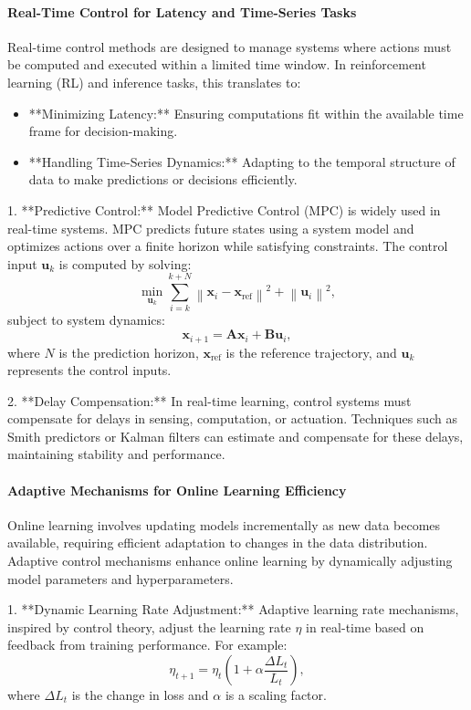 \documentclass{IEEEojcsys}
\begin{document}
\paragraph{Real-Time Control for Latency and Time-Series Tasks}
Real-time control methods are designed to manage systems where actions must be computed and executed within a limited time window. In reinforcement learning (RL) and inference tasks, this translates to:
\begin{itemize}
    \item **Minimizing Latency:** Ensuring computations fit within the available time frame for decision-making.
    \item **Handling Time-Series Dynamics:** Adapting to the temporal structure of data to make predictions or decisions efficiently.
\end{itemize}

1. **Predictive Control:**
   Model Predictive Control (MPC) is widely used in real-time systems. MPC predicts future states using a system model and optimizes actions over a finite horizon while satisfying constraints. The control input $\mathbf{u}_k$ is computed by solving:
   \[
   \min_{\mathbf{u}_k} \sum_{i=k}^{k+N} \left\| \mathbf{x}_i - \mathbf{x}_{\text{ref}} \right\|^2 + \left\| \mathbf{u}_i \right\|^2,
   \]
   subject to system dynamics:
   \[
   \mathbf{x}_{i+1} = \mathbf{A} \mathbf{x}_i + \mathbf{B} \mathbf{u}_i,
   \]
   where $N$ is the prediction horizon, $\mathbf{x}_{\text{ref}}$ is the reference trajectory, and $\mathbf{u}_k$ represents the control inputs.

2. **Delay Compensation:**
   In real-time learning, control systems must compensate for delays in sensing, computation, or actuation. Techniques such as Smith predictors or Kalman filters can estimate and compensate for these delays, maintaining stability and performance.

\paragraph{Adaptive Mechanisms for Online Learning Efficiency}
Online learning involves updating models incrementally as new data becomes available, requiring efficient adaptation to changes in the data distribution. Adaptive control mechanisms enhance online learning by dynamically adjusting model parameters and hyperparameters.

1. **Dynamic Learning Rate Adjustment:**
   Adaptive learning rate mechanisms, inspired by control theory, adjust the learning rate $\eta$ in real-time based on feedback from training performance. For example:
   \[
   \eta_{t+1} = \eta_t \left(1 + \alpha \frac{\Delta L_t}{L_t}\right),
   \]
   where $\Delta L_t$ is the change in loss and $\alpha$ is a scaling factor.
\end{document}
